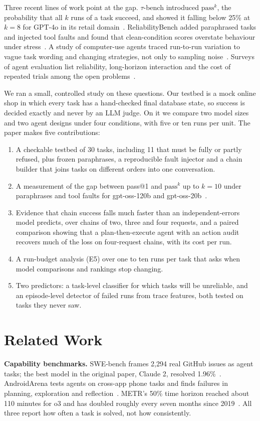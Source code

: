 \documentclass[10pt,a4paper,twocolumn]{article}
\newcommand{\passk}[1]{\mathrm{pass}^{#1}}
\begin{document}
Three recent lines of work point at the gap. $\tau$-bench introduced $\passk{k}$, the probability that all $k$ runs of
a task succeed, and showed it falling below 25\% at $k=8$ for GPT-4o in its retail domain~\cite{taubench}.
ReliabilityBench added paraphrased tasks and injected tool faults and found that clean-condition scores overstate
behaviour under stress~\cite{reliabilitybench}. A study of computer-use agents traced run-to-run variation to vague task
wording and changing strategies, not only to sampling noise~\cite{cua}. Surveys of agent evaluation list reliability,
long-horizon interaction and the cost of repeated trials among the open problems~\cite{kdd,yehudai,gabauer,chowa}.

We ran a small, controlled study on these questions. Our testbed is a mock online shop in which every task has a
hand-checked final database state, so success is decided exactly and never by an LLM judge. On it we compare two model
sizes and two agent designs under four conditions, with five or ten runs per unit. The paper makes five contributions:
\begin{enumerate}[leftmargin=*,itemsep=0pt,topsep=2pt]
\item A checkable testbed of 30 tasks, including 11 that must be fully or partly refused, plus frozen paraphrases, a
reproducible fault injector and a chain builder that joins tasks on different orders into one conversation.
\item A measurement of the gap between pass@1 and $\passk{k}$ up to $k=10$ under paraphrases and tool faults for
gpt-oss-120b and gpt-oss-20b~\cite{gptoss}.
\item Evidence that chain success falls much faster than an independent-errors model predicts, over chains of two, three
and four requests, and a paired comparison showing that a plan-then-execute agent with an action audit recovers much of
the loss on four-request chains, with its cost per run.
\item A run-budget analysis (E5) over one to ten runs per task that asks when model comparisons and rankings stop
changing.
\item Two predictors: a task-level classifier for which tasks will be unreliable, and an episode-level detector of
failed runs from trace features, both tested on tasks they never saw.
\end{enumerate}

\section{Related Work}
\textbf{Capability benchmarks.} SWE-bench frames 2,294 real GitHub issues as agent tasks; the best model in the original
paper, Claude 2, resolved 1.96\%~\cite{swebench}. AndroidArena tests agents on cross-app phone tasks and finds failures
in planning, exploration and reflection~\cite{androidarena}. METR's 50\% time horizon reached about 110 minutes for o3
and has doubled roughly every seven months since 2019~\cite{metr}. All three report how often a task is solved, not how
consistently.
\end{document}
